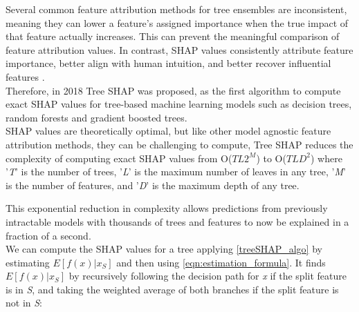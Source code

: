 Several common feature attribution methods for tree ensembles are inconsistent, meaning they can lower a feature’s assigned importance when the true impact of that feature actually increases. This can prevent the meaningful comparison of feature attribution values. In contrast, SHAP values consistently attribute feature importance, better align with human intuition, and better recover influential features \cite{Tree-SHAP}.\\
Therefore, in 2018 Tree SHAP was proposed, as the first algorithm to compute exact SHAP values for tree-based machine learning models such as decision trees, random forests and gradient boosted trees.\\

SHAP values are theoretically optimal, but like other model agnostic feature attribution methods, they can be challenging to compute, Tree SHAP reduces the complexity of computing exact SHAP values from O($TL2^{M}$) to O(\textit{$TLD^{2}$}) where '\textit{T}' is the number of trees, '\textit{L}' is the maximum number of leaves in any tree, '\textit{M}' is the number of features, and '\textit{D}' is the maximum depth of any tree. 


This exponential reduction in complexity allows predictions from previously intractable models with thousands of trees and features to now be explained in a fraction of a second.\\


We can compute the SHAP values for a tree applying \autoref{treeSHAP_algo} by estimating $E[f(x) | x_{S}]$ and then using \autoref{eqn:estimation_formula}.
It finds $E[f(x) | x_{S}]$ by recursively following the decision path for \textit{x} if the split feature is in \textit{S}, and taking the weighted average of both branches if the split feature is not in \textit{S}:

